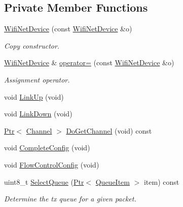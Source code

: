 \subsection*{Private Member Functions}
\begin{DoxyCompactItemize}
\item 
\hyperlink{classns3_1_1WifiNetDevice_ab79fd314b62ef0c1466f70124302dc3c}{Wifi\+Net\+Device} (const \hyperlink{classns3_1_1WifiNetDevice}{Wifi\+Net\+Device} \&o)
\begin{DoxyCompactList}\small\item\em Copy constructor. \end{DoxyCompactList}\item 
\hyperlink{classns3_1_1WifiNetDevice}{Wifi\+Net\+Device} \& \hyperlink{classns3_1_1WifiNetDevice_ad45758872bafae63719713ad22354801}{operator=} (const \hyperlink{classns3_1_1WifiNetDevice}{Wifi\+Net\+Device} \&o)
\begin{DoxyCompactList}\small\item\em Assignment operator. \end{DoxyCompactList}\item 
void \hyperlink{classns3_1_1WifiNetDevice_a09143d94abe5c2e26b09d15c41ecf4d0}{Link\+Up} (void)
\item 
void \hyperlink{classns3_1_1WifiNetDevice_a2e0915025b8931a83f2fd63c55e5cdff}{Link\+Down} (void)
\item 
\hyperlink{classns3_1_1Ptr}{Ptr}$<$ \hyperlink{classns3_1_1Channel}{Channel} $>$ \hyperlink{classns3_1_1WifiNetDevice_a90d7955901fe2632e2dbd058f3729625}{Do\+Get\+Channel} (void) const 
\item 
void \hyperlink{classns3_1_1WifiNetDevice_a8cb2f1a2be048d6a5384f688934463e5}{Complete\+Config} (void)
\item 
void \hyperlink{classns3_1_1WifiNetDevice_af84ee4b2942924a3e819a2a98b891e69}{Flow\+Control\+Config} (void)
\item 
uint8\+\_\+t \hyperlink{classns3_1_1WifiNetDevice_a12abdbf8bfe800f2110784db3efd8e6b}{Select\+Queue} (\hyperlink{classns3_1_1Ptr}{Ptr}$<$ \hyperlink{classns3_1_1QueueItem}{Queue\+Item} $>$ item) const 
\begin{DoxyCompactList}\small\item\em Determine the tx queue for a given packet. \end{DoxyCompactList}\end{DoxyCompactItemize}
